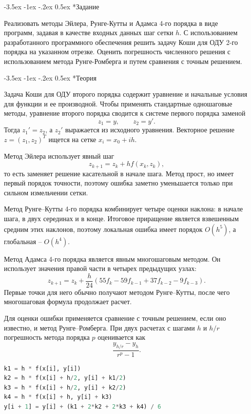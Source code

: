 \documentclass[14pt, a4paper]{article}
\makeatletter
\renewcommand\section{\@startsection {section}{1}{\parindent}%
  {-3.5ex \@plus -1ex \@minus -.2ex}%
  {0.5ex}%
  {\normalfont\Large\bfseries}}
\makeatother
\begin{document}
\section*{Задание}
Реализовать методы Эйлера, Рунге-Кутты и Адамса 4-го порядка в виде программ, задавая в качестве входных данных шаг сетки $h$. С использованием разработанного программного обеспечения решить задачу Коши для ОДУ 2-го порядка на указанном отрезке. Оценить погрешность численного решения с использованием метода Рунге-Ромберга и путем сравнения с точным решением.

\section*{Теория}
Задача Коши для ОДУ второго порядка содержит уравнение и начальные условия для функции и ее производной. Чтобы применять стандартные одношаговые методы, уравнение второго порядка сводится к системе первого порядка заменой
\[
    z_1=y,\qquad z_2=y'.
\]
Тогда $z_1'=z_2$, а $z_2'$ выражается из исходного уравнения. Векторное решение $z=(z_1,z_2)^T$ ищется на сетке $x_i=x_0+ih$.

Метод Эйлера использует явный шаг
\[
    z_{k+1}=z_k+h f(x_k,z_k),
\]
то есть заменяет решение касательной в начале шага. Метод прост, но имеет первый порядок точности, поэтому ошибка заметно уменьшается только при сильном измельчении сетки.

Метод Рунге--Кутты 4-го порядка комбинирует четыре оценки наклона: в начале шага, в двух серединах и в конце. Итоговое приращение является взвешенным средним этих наклонов, поэтому локальная ошибка имеет порядок $O(h^5)$, а глобальная -- $O(h^4)$.

Метод Адамса 4-го порядка является явным многошаговым методом. Он использует значения правой части в четырех предыдущих узлах:
\[
    z_{k+1}=z_k+\frac{h}{24}\left(55f_k-59f_{k-1}+37f_{k-2}-9f_{k-3}\right).
\]
Первые точки для него обычно получают методом Рунге--Кутты, после чего многошаговая формула продолжает расчет.

Для оценки ошибки применяется сравнение с точным решением, если оно известно, и метод Рунге--Ромберга. При двух расчетах с шагами $h$ и $h/r$ погрешность метода порядка $p$ оценивается как
\[
    \frac{y_{h/r}-y_h}{r^p-1}.
\]

\begin{lstlisting}[language=Python]
k1 = h * f(x[i], y[i])
k2 = h * f(x[i] + h/2, y[i] + k1/2)
k3 = h * f(x[i] + h/2, y[i] + k2/2)
k4 = h * f(x[i] + h, y[i] + k3)
y[i + 1] = y[i] + (k1 + 2*k2 + 2*k3 + k4) / 6
\end{lstlisting}
\end{document}
